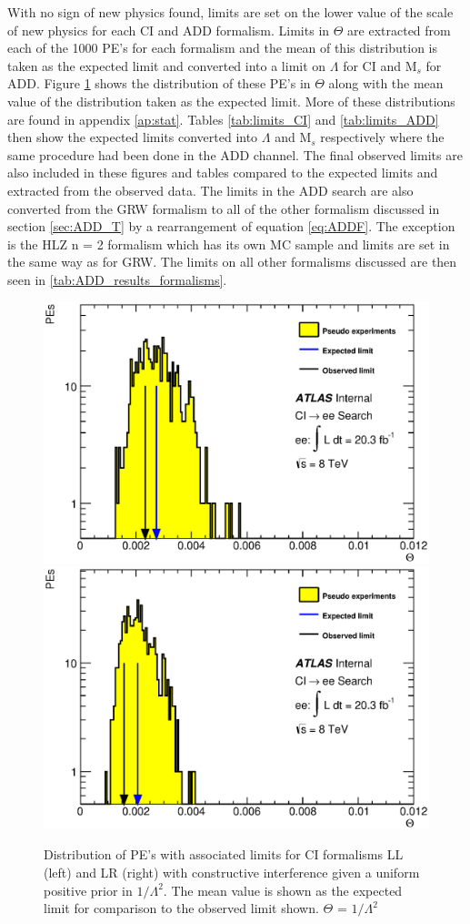     With no sign of new physics found, limits are set on the lower value of the scale of new physics for each CI and ADD formalism. Limits in $\Theta$ are extracted from each of the 1000 PE's for each formalism and the mean of this distribution is taken as the expected limit and converted into a limit on $\Lambda$ for CI and M$_{s}$ for ADD. Figure \ref{fig:Theta_CI_main} shows the distribution of these PE's in $\Theta$ along with the mean value of the distribution taken as the expected limit. More of these distributions are found in appendix \ref{ap:stat}. Tables \ref{tab:limits_CI} and \ref{tab:limits_ADD} then show the expected limits converted into $\Lambda$ and M$_{s}$ respectively where the same procedure had been done in the ADD channel. The final observed limits are also included in these figures and tables compared to the expected limits and extracted from the observed data. The limits in the ADD search are also converted from the GRW formalism to all of the other formalism discussed in section \ref{sec:ADD_T} by a rearrangement of equation \ref{eq:ADDF}. The exception is the HLZ n = 2 formalism which has its own MC sample and limits are set in the same way as for GRW. The limits on all other formalisms discussed are then seen in \ref{tab:ADD_results_formalisms}.


    \begin{figure}[h]
        \begin{center}
            \includegraphics[width=0.49\linewidth]{images/ee__LL_minus_L2/Theta.eps}
            \includegraphics[width=0.49\linewidth]{images/ee__LR_minus_L2/Theta.eps}
        \end{center}
       \caption{Distribution of PE's with associated limits for CI formalisms LL (left) and LR (right) with constructive interference given a uniform positive prior in $1/\Lambda^{2}$. The mean value is shown as the expected limit for comparison to the observed limit shown. $\Theta$ = $1/\Lambda^{2}$}
       \label{fig:Theta_CI_main}
    \end{figure}

